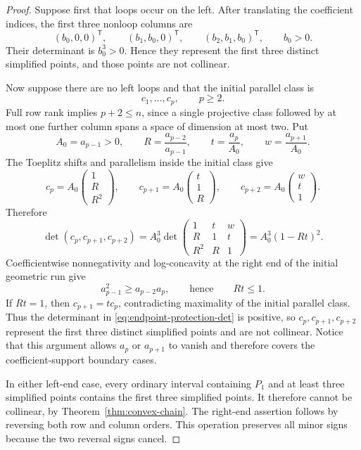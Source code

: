 \documentclass{amsart}
\numberwithin{equation}{section}
\theoremstyle{definition}
\theoremstyle{remark}
\newcommand{\transpose}{\mathsf T}
\begin{document}
\begin{proof}
Suppose first that loops occur on the left.  After translating the coefficient indices, the first three nonloop columns are
\[
 (b_0,0,0)^{\transpose},
 \qquad
 (b_1,b_0,0)^{\transpose},
 \qquad
 (b_2,b_1,b_0)^{\transpose},
 \qquad b_0>0.
\]
Their determinant is $b_0^3>0$.  Hence they represent the first three distinct simplified points, and those points are not collinear.

Now suppose there are no left loops and that the initial parallel class is
\[
 c_1,\ldots,c_p,
 \qquad p\ge2.
\]
Full row rank implies $p+2\le n$, since a single projective class followed by at most one further column spans a space of dimension at most two.  Put
\[
 A_0=a_{p-1}>0,
 \qquad
 R=\frac{a_{p-2}}{a_{p-1}},
 \qquad
 t=\frac{a_p}{A_0},
 \qquad
 w=\frac{a_{p+1}}{A_0}.
\]
The Toeplitz shifts and parallelism inside the initial class give
\[
 c_p=A_0\begin{pmatrix}1\\R\\R^2\end{pmatrix},
 \qquad
 c_{p+1}=A_0\begin{pmatrix}t\\1\\R\end{pmatrix},
 \qquad
 c_{p+2}=A_0\begin{pmatrix}w\\t\\1\end{pmatrix}.
\]
Therefore
\begin{equation}\label{eq:endpoint-protection-det}
 \det(c_p,c_{p+1},c_{p+2})
 =A_0^3
 \det\begin{pmatrix}
 1&t&w\\
 R&1&t\\
 R^2&R&1
 \end{pmatrix}
 =A_0^3(1-Rt)^2.
\end{equation}
Coefficientwise nonnegativity and log-concavity at the right end of the initial geometric run give
\[
 a_{p-1}^2\ge a_{p-2}a_p,
 \qquad\text{hence}\qquad Rt\le1.
\]
If $Rt=1$, then $c_{p+1}=t c_p$, contradicting maximality of the initial parallel class.  Thus the determinant in \eqref{eq:endpoint-protection-det} is positive, so $c_p,c_{p+1},c_{p+2}$ represent the first three distinct simplified points and are not collinear.  Notice that this argument allows $a_p$ or $a_{p+1}$ to vanish and therefore covers the coefficient-support boundary cases.

In either left-end case, every ordinary interval containing $P_1$ and at least three simplified points contains the first three simplified points.  It therefore cannot be collinear, by Theorem~\ref{thm:convex-chain}.  The right-end assertion follows by reversing both row and column orders.  This operation preserves all minor signs because the two reversal signs cancel.
\end{proof}
\end{document}
